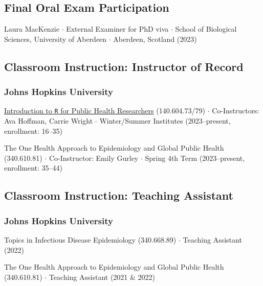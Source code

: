 \documentclass{cv}
\begin{document}

\subsection*{Final Oral Exam Participation}

Laura MacKenzie $\cdot$ External Examiner for PhD viva $\cdot$ School of Biological Sciences, University of Aberdeen $\cdot$ Aberdeen, Scotland (2023)

\subsection*{Classroom Instruction: Instructor of Record}

\subsubsection*{Johns Hopkins University}

\href{https://jhudatascience.org/intro_to_r/}{Introduction to \texttt{R} for Public Health Researchers} (140.604.73/79) $\cdot$ Co-Instructors: Ava Hoffman, Carrie Wright $\cdot$ Winter/Summer Institutes (2023--present, enrollment: 16--35)

The One Health Approach to Epidemiology and Global Public Health (340.610.81) $\cdot$ Co-Instructor: Emily Gurley $\cdot$ Spring 4th Term (2023--present, enrollment: 35--44)


\subsection*{Classroom Instruction: Teaching Assistant}

\subsubsection*{Johns Hopkins University}

Topics in Infectious Disease Epidemiology (340.668.89) $\cdot$ Teaching Assistant (2022)

The One Health Approach to Epidemiology and Global Public Health (340.610.81) $\cdot$ Teaching Assistant (2021 \& 2022)
\end{document}
